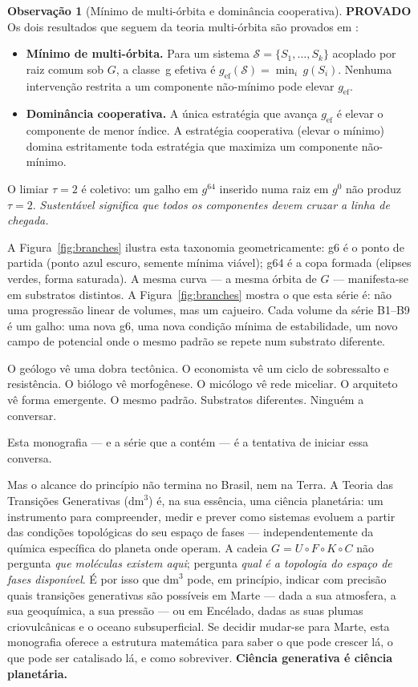 \documentclass[12pt,a4paper,twoside]{book}
\theoremstyle{plain}
\theoremstyle{definition}
\newcommand{\provadostamp}{\noindent\colorbox{cajunavy!10}{\color{cajunavy}\bfseries\small PROVADO}\quad}
\theoremstyle{definition}
\newtheorem{observacao}[teorema]{Observação}
\newcommand{\dm}{\mathrm{dm}^{3}}
\begin{document}
\begin{observacao}[Mínimo de multi-órbita e dominância cooperativa]
\provadostamp
Os dois resultados que seguem da teoria multi-órbita são provados
em \cite{GrossiMultiOrbit,GrossiJomo}:
\begin{itemize}
  \item \textbf{Mínimo de multi-órbita.} Para um sistema $\mathcal{S} =
    \{S_1,\dots,S_k\}$ acoplado por raiz comum sob $G$, a classe~g efetiva
    é $g_{\mathrm{ef}}(\mathcal{S}) = \min_i\, g(S_i)$.
    Nenhuma intervenção restrita a um componente não-mínimo pode elevar
    $g_{\mathrm{ef}}$.
  \item \textbf{Dominância cooperativa.} A única estratégia que avança
    $g_{\mathrm{ef}}$ é elevar o componente de menor índice.
    A estratégia cooperativa (elevar o mínimo) domina estritamente toda
    estratégia que maximiza um componente não-mínimo.
\end{itemize}
O limiar $\tau = 2$ é coletivo: um galho em $g^{64}$ inserido numa raiz
em $g^0$ não produz $\tau = 2$. \emph{Sustentável significa que todos os
componentes devem cruzar a linha de chegada.}
\end{observacao}

A Figura~\ref{fig:branches} ilustra esta taxonomia geometricamente: g6 é o ponto
de partida (ponto azul escuro, semente mínima viável); g64 é a copa formada (elipses
verdes, forma saturada). A mesma curva --- a mesma órbita de $G$ --- manifesta-se
em substratos distintos. A Figura~\ref{fig:branches} mostra o que esta série é: não uma progressão
linear de volumes, mas um cajueiro. Cada volume da série B1--B9 é
um galho: uma nova g6, uma nova condição mínima de estabilidade, um novo
campo de potencial onde o mesmo padrão se repete num substrato diferente.

O geólogo vê uma dobra tectônica. O economista vê um ciclo de
sobressalto e resistência. O biólogo vê morfogênese. O micólogo vê rede
miceliar. O arquiteto vê forma emergente. O mesmo padrão. Substratos
diferentes. Ninguém a conversar.

Esta monografia --- e a série que a contém --- é a tentativa de
iniciar essa conversa.

Mas o alcance do princípio não termina no Brasil, nem na Terra. A Teoria das
Transições Generativas ($\dm$) é, na sua essência, uma ciência planetária:
um instrumento para compreender, medir e prever como sistemas evoluem a
partir das condições topológicas do seu espaço de fases --- independentemente
da química específica do planeta onde operam. A cadeia $G = U \circ F \circ K
\circ C$ não pergunta \emph{que moléculas existem aqui}; pergunta \emph{qual
é a topologia do espaço de fases disponível}. É por isso que $\dm$ pode,
em princípio, indicar com precisão quais transições generativas são possíveis
em Marte --- dada a sua atmosfera, a sua geoquímica, a sua pressão --- ou em
Encélado, dadas as suas plumas criovulcânicas e o oceano subsuperficial.
Se decidir mudar-se para Marte, esta monografia oferece a estrutura
matemática para saber o que pode crescer lá, o que pode ser catalisado lá,
e como sobreviver. \textbf{Ciência generativa é ciência planetária.}
\end{document}
